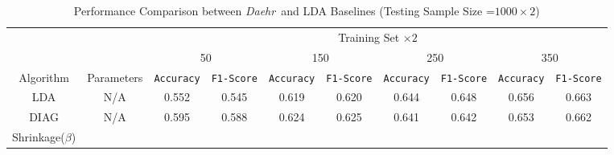 \documentclass[journal,compsoc]{IEEEtran}
\newcommand{\TheName}{\mbox{\emph{Daehr}}}
\begin{document}
\begin{table}
{
\begin{center}
\caption{Performance Comparison between \TheName\ and LDA Baselines  (Testing Sample Size =$1000\times 2$)}
		\label{tab:table12}
\begin{tabular}{*{10}{c}}
\toprule
    & & \multicolumn{8}{c}{Training Set $\times 2$}\\
    \cmidrule(lr){3-10}
    & & 
    \multicolumn{2}{c}{50} &
    \multicolumn{2}{c}{150} &
    \multicolumn{2}{c}{250} &
    \multicolumn{2}{c}{350} \\
\cmidrule(lr){3-4}
\cmidrule(lr){5-6}
\cmidrule(lr){7-8}
\cmidrule(lr){9-10}
Algorithm & Parameters & \texttt{Accuracy} & \texttt{F1-Score} &
						\texttt{Accuracy} & \texttt{F1-Score} &
                           \texttt{Accuracy} & \texttt{F1-Score}  &
                           \texttt{Accuracy} & \texttt{F1-Score}  \\
 \cmidrule(lr){1-2}                        
\cmidrule(lr){3-4}
\cmidrule(lr){5-6}
\cmidrule(lr){7-8}
\cmidrule(lr){9-10}
    LDA & N/A &   0.552 & 0.545  &     0.619 & 0.620      & 0.644 & 0.648      & 0.656 & 0.663  \\

     \cmidrule(lr){1-2}                        
\cmidrule(lr){3-4}
\cmidrule(lr){5-6}
\cmidrule(lr){7-8}
\cmidrule(lr){9-10}
    DIAG & N/A &   0.595 & 0.588  &     0.624 & 0.625      & 0.641 & 0.642     & 0.653 & 0.662  \\
    \cmidrule(lr){1-2}                        
\cmidrule(lr){3-4}
\cmidrule(lr){5-6}
\cmidrule(lr){7-8}
\cmidrule(lr){9-10}

    \multirow{3}{*}{Shrinkage($\beta$)} 


\end{tabular}
\end{center}}
\end{table}
\end{document}
